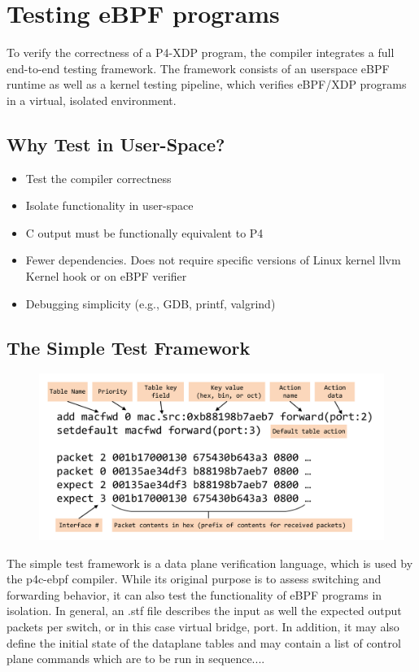 \section{Testing eBPF programs}\label{sec:testing}
To verify the correctness of a P4-XDP program, the compiler integrates a full 
end-to-end testing framework. The framework consists of an userspace eBPF 
runtime as well as a kernel testing pipeline, which verifies eBPF/XDP programs 
in a virtual, isolated environment.

\subsection{Why Test in User-Space?}
\begin{itemize}
	\item Test the compiler correctness
	\item Isolate functionality in user-space
	\item C output must be functionally equivalent to P4
	\item Fewer dependencies. Does not require specific versions of Linux 
	kernel llvm Kernel hook or on eBPF verifier
	\item Debugging simplicity (e.g., GDB, printf, valgrind)
\end{itemize}

\subsection{The Simple Test Framework}
\begin{figure}
	\centering
	\includegraphics[width=0.7\linewidth]{stf}
	\caption{}
	\label{fig:stf}
\end{figure}
The simple test framework is a data plane verification language, which is used 
by the p4c-ebpf compiler. While its original purpose is to assess switching and 
forwarding behavior, it can also test the functionality of eBPF programs in 
isolation.
In general, an .stf file describes the input as well the expected output 
packets per switch, or in this case virtual bridge, port. In addition, it may 
also define the initial state of the dataplane tables and may contain a list of 
control plane commands which are to be run in sequence....


